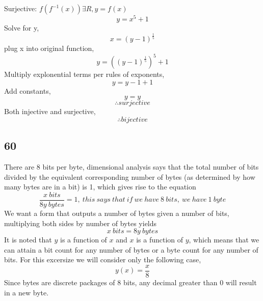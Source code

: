 \documentclass[journal]{IEEEtran}
\begin{document}
        Surjective: $f(f^{-1}(x)) \exists R, y = f(x)$
        \begin{equation}
            y = x^5 + 1
        \end{equation}
        Solve for y,
        \begin{equation}
            x = (y-1)^{\frac{1}{5}}
        \end{equation}
        plug x into original function,
        \begin{equation}
            y = ((y-1)^{\frac{1}{5}})^5 + 1
        \end{equation}
        Multiply explonential terms per rules of exponents,
        \begin{equation}
            y = y-1 + 1
        \end{equation}
        Add constants,
        \begin{equation}
            y = y
        \end{equation}
        $$\therefore surjective$$
        Both injective and surjective,
        $$\boxed{\therefore bijective}$$
        
\subsection*{60}
        There are $8$ bits per byte, dimensional analysis says that the total number
        of bits divided by the equivalent corresponding number of bytes
        (as determined by how many bytes are in a bit) is 1, which gives rise to the equation
        \begin{equation}
            \frac{x~bits}{8y~bytes} = 1, ~this~says~that~if~we~have~8~bits,~we~have~1~byte
        \end{equation}
        We want a form that outputs a number of bytes given a number of bits,
        multiplying both sides by number of bytes yields
        \begin{equation}
            x~bits = 8y~bytes
        \end{equation}
        It is noted that $y$ is a function of $x$ and $x$ is a function of $y$,
        which means that we can attain a bit count for any number of bytes or 
        a byte count for any number of bits. For this excersize we will consider only the following case,
        \begin{equation}
            y(x) = \frac{x}{8}
        \end{equation}
        Since bytes are discrete packages of 8 bits, any decimal greater than $0$ will result in a new byte.
\end{document}
